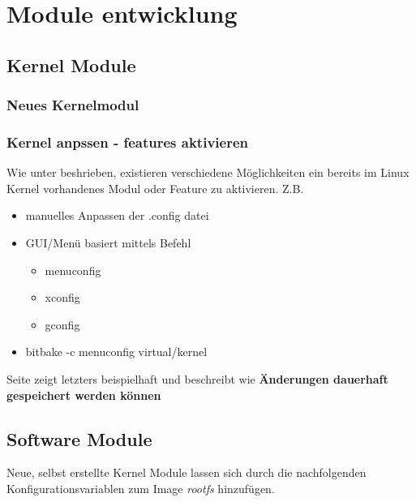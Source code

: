
\chapter{Module entwicklung}%
\label{cha:module_entwicklung}


\section{Kernel Module}%
\label{sec:kernel_module}

\subsection{Neues Kernelmodul}%
\label{sub:neues_kernelmodul}


\subsection{Kernel anpssen - features aktivieren}%
\label{sub:kernel_anpssen_features_aktivieren}

Wie unter \cite[109]{Gonzalez2018:Embedded_Linux_Development_Using_Yocto_Project_Cookbook_2nd}
beshrieben, existieren verschiedene Möglichkeiten ein bereits im Linux Kernel
vorhandenes Modul oder \gls{Feature} zu aktivieren. Z.B.

\begin{itemize}
    \item manuelles Anpassen der .config datei
    \item GUI/Menü basiert mittels Befehl
        \begin{itemize}
            \item menuconfig
            \item xconfig
            \item gconfig
        \end{itemize}
    \item bitbake -c menuconfig virtual/kernel
\end{itemize}

Seite \cite[S. 114 und S. 118]{Gonzalez2018:Embedded_Linux_Development_Using_Yocto_Project_Cookbook_2nd}
zeigt letzters beispielhaft und beschreibt wie \textbf{Änderungen dauerhaft
    gespeichert werden können}


\section{Software Module}%
\label{sec:software_module}

Neue, selbst erstellte Kernel Module lassen sich durch die nachfolgenden
Konfigurations\-variablen zum Image \textit{rootfs} hinzufügen.

